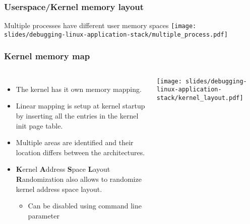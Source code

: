 \begin{frame}
  \frametitle{Userspace/Kernel memory layout}
  Multiple processes have different user memory spaces
  \center\texttt{[image: slides/debugging-linux-application-stack/multiple\_process.pdf]}
\end{frame}

\begin{frame}[fragile]
  \frametitle{Kernel memory map}
  \begin{columns}
    \begin{itemize}
      \item The kernel has it own memory mapping.
      \item Linear mapping is setup at kernel startup by inserting all the
            entries in the kernel init page table.
      \item Multiple areas are identified and their location differs between the
            architectures.
      \item {\bf K}ernel {\bf A}ddress {\bf S}pace {\bf L}ayout
            {\bf R}andomization also allows to randomize kernel address space
            layout.
      \begin{itemize}
        \item Can be disabled using  command line parameter
      \end{itemize}
    \end{itemize}
    \texttt{[image: slides/debugging-linux-application-stack/kernel\_layout.pdf]}
  \end{columns}
\end{frame}

